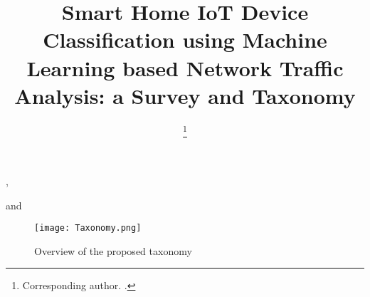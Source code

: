 \documentclass[aic]{iosart2x}
\begin{document}
\begin{frontmatter}


\title{Smart Home IoT Device Classification using Machine Learning based Network Traffic Analysis: a Survey and Taxonomy}

\author[A]{ %
\thanks{Corresponding author. .}},
\author[B]{ }
and
\author[B]{ }
\address[A]{Department first, ,
Abbreviate US states, }
\address[B]{Department first, ,
Abbreviate US states, }



\end{frontmatter}

\appendixpage
\label{Appendix}

\begin{figure*}[h]
\caption{Overview of the proposed taxonomy}
\label{fig:Taxonomy}
\texttt{[image: Taxonomy.png]}
\medskip 
 \centering
\end{figure*}

\clearpage
\onecolumn
\end{document}

